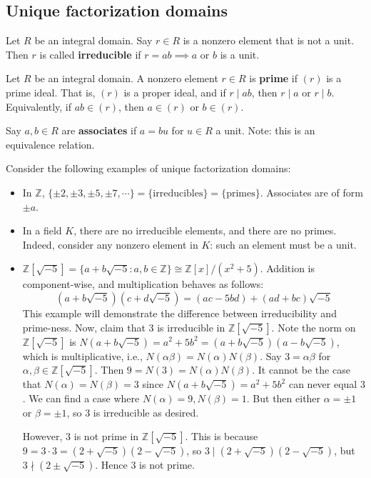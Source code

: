 \documentclass{article}
\theoremstyle{plain}
\newcommand{\Z}{\mathbb{Z}}
\begin{document}
\subsection{Unique factorization domains}
\begin{definition}{}{}
Let $R$ be an integral domain. Say $r \in R$ is a nonzero element that is not a unit. Then $r$ is called \textbf{irreducible} if $r=ab \implies a$ or $b$ is a unit.	
\end{definition}
\begin{definition}{}{}
	Let $R$ be an integral domain. A nonzero element $r \in R$ is \textbf{prime} if $(r)$ is a prime ideal. That is, $(r)$ is a proper ideal, and if $r \mid ab$, then $r\mid a$ or $r\mid b$. Equivalently, if $ab \in (r)$, then $a \in (r)$ or $b \in (r)$.
\end{definition}
\begin{definition}{}{}
	Say $a,b \in R$ are \textbf{associates} if $a=bu$ for $u \in R$ a unit. Note: this is an equivalence relation.	
\end{definition}
Consider the following examples of unique factorization domains:
\begin{itemize}
\item In $\Z$, $\{ \pm 2, \pm 3, \pm 5, \pm 7, \cdots \} = \{ \text{irreducibles} \} = \{ \text{primes} \}$. Associates are of form $\pm a$.
\item In a field $K$, there are no irreducible elements, and there are no primes. Indeed, consider any nonzero element in $K$: such an element must be a unit.
\item $\Z[\sqrt{-5}] = \{ a+b\sqrt{-5} : a,b\in\Z \} \cong \Z[x]/(x^2+5)$. Addition is component-wise, and multiplication behaves as follows:
	$$(a+b\sqrt{-5})(c+d\sqrt{-5}) = (ac-5bd) + (ad + bc)\sqrt{-5}$$
	This example will demonstrate the difference between irreducibility and prime-ness.
	Now, claim that $3$ is irreducible in $\Z[\sqrt{-5}]$. Note the norm on $\Z[\sqrt{-5}]$ is $N(a+b\sqrt{-5}) = a^2 + 5b^2 = (a+b\sqrt{-5})(a-b\sqrt{-5})$, which is multiplicative, i.e., $N(\alpha\beta) = N(\alpha)N(\beta)$. Say $3 = \alpha\beta$ for $\alpha,\beta \in \Z[\sqrt{-5}]$. Then $9 = N(3) = N(\alpha)N(\beta)$. It cannot be the case that $N(\alpha) = N(\beta) = 3$ since $N(a+b\sqrt{-5}) = a^2 + 5b^2$ can never equal $3$. We can find a case where $N(\alpha) = 9, N(\beta) = 1$. But then either $\alpha = \pm 1$ or $\beta = \pm 1$, so $3$ is irreducible as desired.
	
	However, $3$ is not prime in $\Z[\sqrt{-5}]$. This is because $9 = 3\cdot 3 = (2 + \sqrt{-5})(2 - \sqrt{-5})$, so $3 \mid (2 + \sqrt{-5})(2 - \sqrt{-5})$, but $3\nmid (2\pm \sqrt{-5})$. Hence $3$ is not prime.
\end{itemize}
\end{document}
